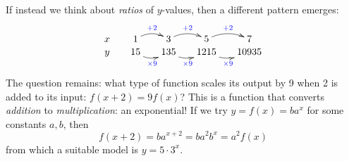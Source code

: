 \begin{example}{}{}
If instead we think about \emph{ratios} of $y$-values, then a different pattern emerges:
\[
	\xymatrix @R0pt @C15pt{
		x & 1 \ar@/^/[r]^{\textcolor{blue}{+2}} & 3 \ar@/^/[r]^{\textcolor{blue}{+2}} &  5 \ar@/^/[r]^{\textcolor{blue}{+2}} & 7 \\
		y & 15 \ar@/_/[r]_{\textcolor{blue}{\times 9}} & 135 \ar@/_/[r]_{\textcolor{blue}{\times 9}} & 1215 \ar@/_/[r]_{\textcolor{blue}{\times 9}} & 10935 
	}
\]
The question remains: what type of function scales its output by 9 when 2 is added to its input: $f(x+2)=9f(x)$? This is a function that converts \emph{addition} to \emph{multiplication}: an exponential! If we try $y=f(x)=ba^x$ for some constants $a,b$, then
\[f(x+2)=ba^{x+2}=ba^2b^x=a^2f(x)\]
from which a suitable model is $y=5\cdot 3^x$.
\end{example}

% 

